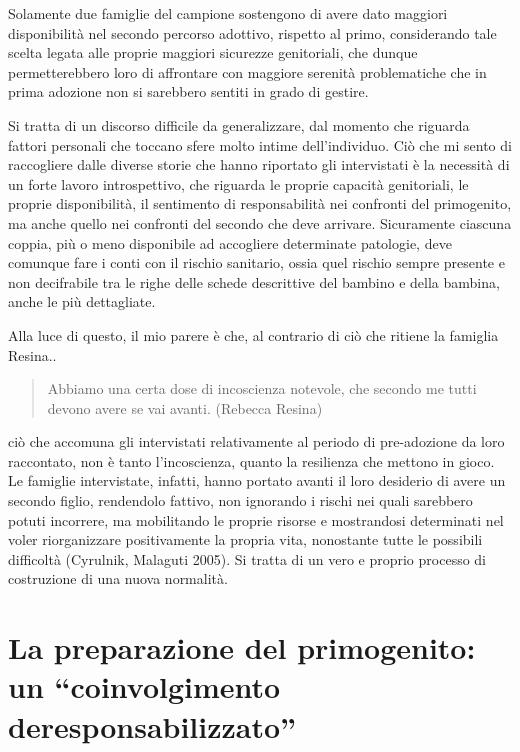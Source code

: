\documentclass[12pt,oneside,svgnames]{memoir}
\newenvironment{quotationb}%
{\color{maincolor}\begin{leftbar}\begin{quotation}}%
{\end{quotation}\end{leftbar}\ignorespacesafterend}
\begin{document}
Solamente due famiglie del campione sostengono di avere dato maggiori
disponibilità nel secondo percorso adottivo, rispetto al primo,
considerando tale scelta legata alle proprie maggiori sicurezze
genitoriali, che dunque permetterebbero loro di affrontare con maggiore
serenità problematiche che in prima adozione non si sarebbero sentiti in
grado di gestire.

Si tratta di un discorso difficile da generalizzare, dal momento che
riguarda fattori personali che toccano sfere molto intime
dell'individuo. Ciò che mi sento di raccogliere dalle diverse storie che
hanno riportato gli intervistati è la necessità di un forte lavoro
introspettivo, che riguarda le proprie capacità genitoriali, le proprie
disponibilità, il sentimento di responsabilità nei confronti del
primogenito, ma anche quello nei confronti del secondo che deve
arrivare. Sicuramente ciascuna coppia, più o meno disponibile ad
accogliere determinate patologie, deve comunque fare i conti con il
rischio sanitario, ossia quel rischio sempre presente e non decifrabile
tra le righe delle schede descrittive del bambino e della bambina, anche
le più dettagliate.

Alla luce di questo, il mio parere è che, al contrario di ciò che
ritiene la famiglia Resina..

\begin{quotationb}
Abbiamo una certa dose di incoscienza notevole, che secondo me tutti
devono avere se vai avanti. (Rebecca Resina)
\end{quotationb}

ciò che accomuna gli intervistati relativamente al periodo di
pre-adozione da loro raccontato, non è tanto l'incoscienza, quanto la
resilienza che mettono in gioco. Le famiglie intervistate, infatti,
hanno portato avanti il loro desiderio di avere un secondo figlio,
rendendolo fattivo, non ignorando i rischi nei quali sarebbero potuti
incorrere, ma mobilitando le proprie risorse e mostrandosi determinati
nel voler riorganizzare positivamente la propria vita, nonostante tutte
le possibili difficoltà (Cyrulnik, Malaguti 2005). Si tratta di un vero
e proprio processo di costruzione di una nuova normalità.

\section{La preparazione del primogenito: un ``coinvolgimento
deresponsabilizzato''}\label{la-preparazione-del-primogenito-un-coinvolgimento-deresponsabilizzato}
\end{document}
